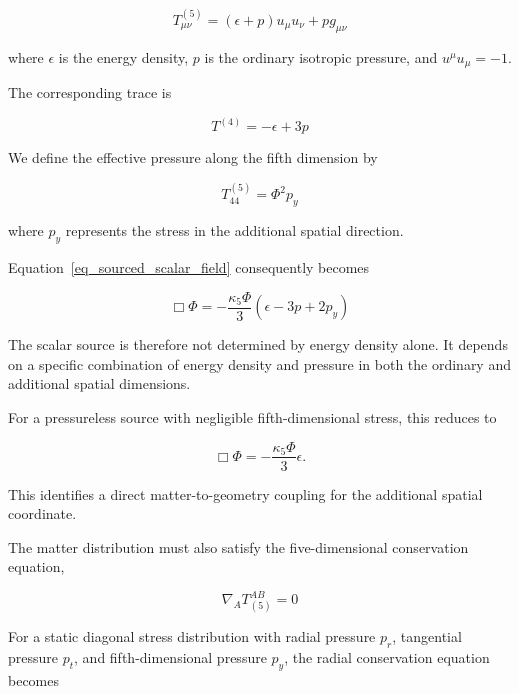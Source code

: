 \documentclass[pdflatex,sn-mathphys-num]{sn-jnl}%
\theoremstyle{thmstyleone}%
\theoremstyle{thmstyletwo}%
\theoremstyle{thmstylethree}%
\begin{document}
\begin{equation}
    T_{\mu\nu}^{(5)}
    =
    (\epsilon+p)u_\mu u_\nu
    +
    pg_{\mu\nu}
\end{equation}

where $\epsilon$ is the energy density, $p$ is the ordinary isotropic pressure, and $u^\mu u_\mu=-1$.

The corresponding trace is

\begin{equation}
    T^{(4)}=-\epsilon+3p
\end{equation}

We define the effective pressure along the fifth dimension by

\begin{equation}
    T_{44}^{(5)}=\Phi^2p_y
\end{equation}

where $p_y$ represents the stress in the additional spatial direction.

Equation~\eqref{eq_sourced_scalar_field} consequently becomes

\begin{equation}
    \boxed{
    \Box\Phi
    =
    -\frac{\kappa_5\Phi}{3}
    \left(
        \epsilon-3p+2p_y
    \right)
    }
    \label{eq_scalar_fluid_source}
\end{equation}

The scalar source is therefore not determined by energy density alone. It depends on a specific combination of energy density and pressure in both the ordinary and additional spatial dimensions.

For a pressureless source with negligible fifth-dimensional stress, this reduces to

\begin{equation}
    \Box\Phi
    =
    -\frac{\kappa_5\Phi}{3}\epsilon.
\end{equation}

This identifies a direct matter-to-geometry coupling for the additional spatial coordinate.

The matter distribution must also satisfy the five-dimensional conservation equation,

\begin{equation}
    \boxed{
    \nabla_A T^{AB}_{(5)}=0
    }
    \label{eq_5d_stress_conservation}
\end{equation}

For a static diagonal stress distribution with radial pressure $p_r$, tangential pressure $p_t$, and fifth-dimensional pressure $p_y$, the radial conservation equation becomes
\end{document}

